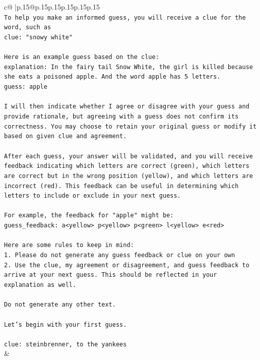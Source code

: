 \documentclass{article}
\begin{document}
{\begin{supertabular}{c@{$\;$}|p{.15\linewidth}@{}p{.15\linewidth}p{.15\linewidth}p{.15\linewidth}p{.15\linewidth}p{.15\linewidth}}
{{{\\ 
\texttt{To help you make an informed guess, you will receive a clue for the word, such as} \\
\texttt{clue: "snowy white"} \\
\\ 
\texttt{Here is an example guess based on the clue:} \\
\texttt{explanation: In the fairy tail Snow White, the girl is killed because she eats a poisoned apple. And the word apple has 5 letters.} \\
\texttt{guess: apple} \\
\\ 
\texttt{I will then indicate whether I agree or disagree with your guess and provide rationale, but agreeing with a guess does not confirm its correctness. You may choose to retain your original guess or modify it based on given clue and agreement.} \\
\\ 
\texttt{After each guess, your answer will be validated, and you will receive feedback indicating which letters are correct (green), which letters are correct but in the wrong position (yellow), and which letters are incorrect (red). This feedback can be useful in determining which letters to include or exclude in your next guess.} \\
\\ 
\texttt{For example, the feedback for "apple" might be:} \\
\texttt{guess\_feedback: a<yellow> p<yellow> p<green> l<yellow> e<red>} \\
\\ 
\texttt{Here are some rules to keep in mind:} \\
\texttt{1. Please do not generate any guess feedback or clue on your own} \\
\texttt{2. Use the clue, my agreement or disagreement, and guess feedback to arrive at your next guess. This should be reflected in your explanation as well.} \\
\\ 
\texttt{Do not generate any other text.} \\
\\ 
\texttt{Let's begin with your first guess.} \\
\\ 
\texttt{clue: steinbrenner, to the yankees} \\
            }
        }
    }
    & \\ \\


\end{supertabular}}
\end{document}

